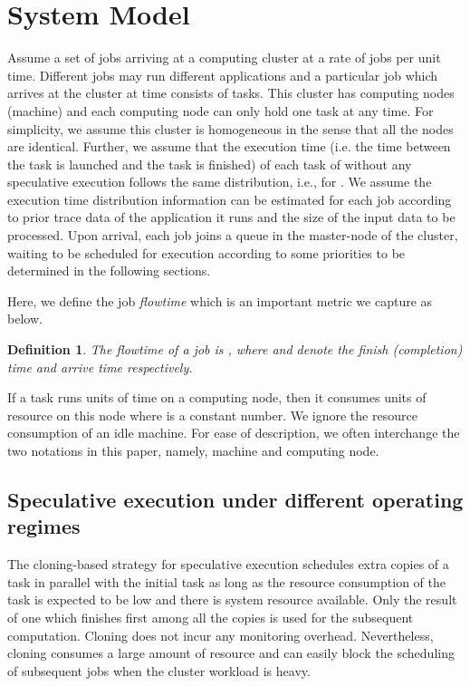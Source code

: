 \documentclass[10pt,conference]{IEEEtran}
\newtheorem{definition}{Definition}
\begin{document}
\section{System Model}
\label{system_model}
Assume a set of jobs   arriving at a computing cluster at a rate of  jobs per unit time. Different jobs may run different applications and a particular job  which arrives at the cluster at time  consists of  tasks. This cluster has  computing nodes (machine) and each computing node can only hold one task at any time. For simplicity, we assume this cluster is homogeneous in the sense that all the nodes are identical. Further, we assume that the execution time (i.e. the time between the task is launched and the task is finished) of each task of   without any speculative execution follows the same distribution, i.e.,  for . We assume the execution time distribution information can be estimated for each job according to prior trace data of the application it runs and the size of the input data to be processed. Upon arrival, each job joins a queue in the master-node of the cluster, waiting to be scheduled for execution according to some priorities to be determined in the following sections.

Here, we define the job \textit{flowtime} which is an important metric we capture as below.
\begin{definition}
The \textit{flowtime} of a job  is , where  and  denote the finish (completion) time and arrive time respectively.
\end{definition}


If a task  runs  units of time on a computing node, then it consumes  units of resource on this node where  is a constant number. We ignore the resource consumption of an idle machine. For ease of description, we often interchange the two notations in this paper, namely, machine and computing node.

\subsection{Speculative execution under different operating regimes}
The cloning-based strategy for speculative execution schedules extra copies of a task in parallel with the initial task as long as the resource consumption of the task is expected to be low and there is system resource available. Only the result of one which finishes first among all the copies is used for the subsequent computation. Cloning does not incur any monitoring overhead. Nevertheless, cloning consumes a large amount of resource and can easily block the scheduling of subsequent jobs when the cluster workload is heavy.
\end{document}
